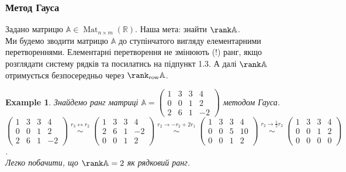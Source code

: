 \documentclass[a4paper, 10pt]{article}
\theoremstyle{theoremdd}
\newtheorem{example}[theorem]{Example}
\DeclareMathOperator{\Mat}{Mat}
\begin{document}
\subsubsection*{Метод Гауса}
Задано матрицю $\mathbb{A} \in \Mat_{n \times m}(\mathbb{R})$. Наша мета: знайти $\rank \mathbb{A}$.\\
Ми будемо зводити матрицю $\mathbb{A}$ до ступінчатого вигляду елементарними перетвореннями. Елементарні перетворення не змінюють (!) ранг, якщо розглядати систему рядків та посилатись на підпункт 1.3. А далі $\rank \mathbb{A}$ отримується безпосередньо через $\rank_{\textrm{row}} \mathbb{A}$.
\begin{example}
Знайдемо ранг матриці $\mathbb{A} = \begin{pmatrix}
1 & 3 & 3 & 4 \\
0 & 0 & 1 & 2 \\
2 & 6 & 1 & -2
\end{pmatrix}$ методом Гауса.\\
$\begin{pmatrix}
1 & 3 & 3 & 4 \\
0 & 0 & 1 & 2 \\
2 & 6 & 1 & -2
\end{pmatrix} \overset{\substack{r_3 \leftrightarrow r_2}}{\sim} \begin{pmatrix}
1 & 3 & 3 & 4 \\
2 & 6 & 1 & -2 \\
0 & 0 & 1 & 2
\end{pmatrix} \overset{\substack{r_2 \to -r_2 + 2r_1}}{\sim} \begin{pmatrix}
1 & 3 & 3 & 4 \\
0 & 0 & 5 & 10 \\
0 & 0 & 1 & 2
\end{pmatrix} \overset{\substack{r_2 \to \frac{1}{5}r_2}}{\sim} \begin{pmatrix}
1 & 3 & 3 & 4 \\
0 & 0 & 1 & 2 \\
0 & 0 & 0 & 0
\end{pmatrix}$.\\
Легко побачити, що $\rank \mathbb{A} = 2$ як рядковий ранг.
\end{example}
\end{document}
